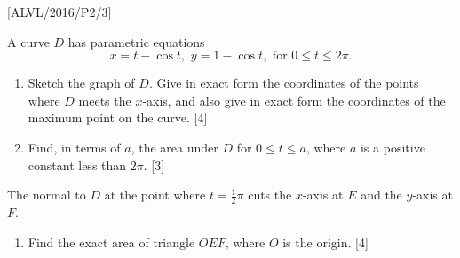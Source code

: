 \item {[}ALVL/2016/P2/3{]}

A curve $D$ has parametric equations 
\[
x=t-\cos t,\,\,y=1-\cos t,\,\,\text{for }0\leq t\leq2\pi.
\]

\begin{enumerate}
\item Sketch the graph of $D$. Give in exact form the coordinates of the
points where $D$ meets the $x$-axis, and also give in exact form
the coordinates of the maximum point on the curve. \hfill{}{[}4{]}
\item Find, in terms of $a$, the area under $D$ for $0\le t\leq a$, where
$a$ is a positive constant less than $2\pi$. \hfill{} {[}3{]}
\end{enumerate}
The normal to $D$ at the point where $t=\frac{1}{2}\pi$ cuts the
$x$-axis at $E$ and the $y$-axis at $F$. 
\begin{enumerate}
\item Find the exact area of triangle $OEF$, where $O$ is the origin.
\hfill{} {[}4{]}
\end{enumerate}
